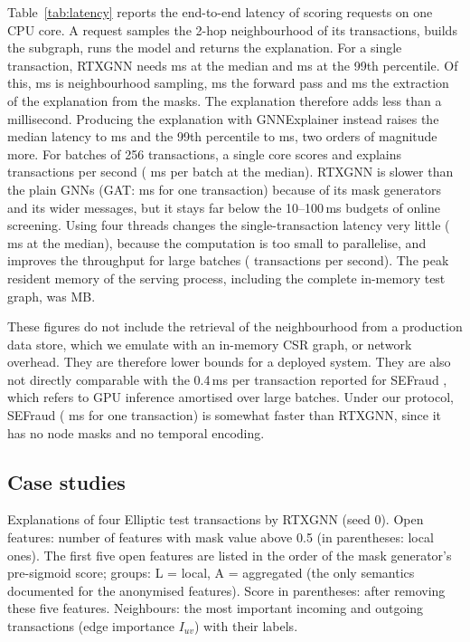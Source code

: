 Table~\ref{tab:latency} reports the end-to-end latency of scoring requests on one CPU core. A request samples the 2-hop neighbourhood of its transactions, builds the subgraph, runs the model and returns the explanation. For a single transaction, RTXGNN needs \rtxLatBoneMed{} ms at the median and \rtxLatBoneP{} ms at the 99th percentile. Of this, \rtxLatBoneSmp{} ms is neighbourhood sampling, \rtxLatBoneFwd{} ms the forward pass and \rtxLatBoneExp{} ms the extraction of the explanation from the masks. The explanation therefore adds less than a millisecond. Producing the explanation with GNNExplainer instead raises the median latency to \rtxgnnexLatBoneMed{} ms and the 99th percentile to \rtxgnnexLatBoneP{} ms, two orders of magnitude more. For batches of 256 transactions, a single core scores and explains \rtxLatBtwofiftysixTps{} transactions per second (\rtxLatBtwofiftysixMed{} ms per batch at the median). RTXGNN is slower than the plain GNNs (GAT: \gatLatBoneMed{} ms for one transaction) because of its mask generators and its wider messages, but it stays far below the 10--100\,ms budgets of online screening. Using four threads changes the single-transaction latency very little (\rtxLatTfourBoneMed{} ms at the median), because the computation is too small to parallelise, and improves the throughput for large batches (\rtxLatTfourBtwofiftysixTps{} transactions per second). The peak resident memory of the serving process, including the complete in-memory test graph, was \peakRss{} MB.

These figures do not include the retrieval of the neighbourhood from a production data store, which we emulate with an in-memory CSR graph, or network overhead. They are therefore lower bounds for a deployed system. They are also not directly comparable with the 0.4\,ms per transaction reported for SEFraud \citep{li2024sefraud}, which refers to GPU inference amortised over large batches. Under our protocol, SEFraud (\sefLatBoneMed{} ms for one transaction) is somewhat faster than RTXGNN, since it has no node masks and no temporal encoding.

\subsection{Case studies}
\label{subsec:cases}

\begin{table}[!t]
\centering
\caption{Explanations of four Elliptic test transactions by RTXGNN (seed 0). Open features: number of features with mask value above 0.5 (in parentheses: local ones). The first five open features are listed in the order of the mask generator's pre-sigmoid score; groups: L = local, A = aggregated (the only semantics documented for the anonymised features). Score in parentheses: after removing these five features. Neighbours: the most important incoming and outgoing transactions (edge importance $I_{uv}$) with their labels.}
\label{tab:cases}
\footnotesize
\begin{adjustbox}{max width=\textwidth}\end{adjustbox}
\end{table}

